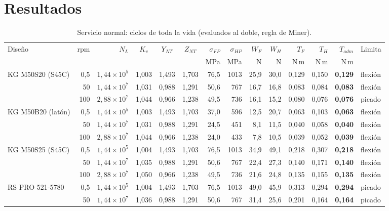 \documentclass[11pt,a4paper]{article}
\begin{document}
\section{Resultados}
\begin{table}[H]\centering\scriptsize\setlength{\tabcolsep}{2.8pt}\caption{Servicio normal: ciclos de toda la vida (evaluados al doble, regla de Miner).}\begin{tabular}{l r r c c c r r r r r r r l}
\toprule
Diseño & rpm & $N_L$ & $K_v$ & $Y_{NT}$ & $Z_{NT}$ & $\sigma_{FP}$ & $\sigma_{HP}$ & $W_F$ & $W_H$ & $T_F$ & $T_H$ & $T_{adm}$ & Limita\\
 & & & & & & MPa & MPa & N & N & N\,m & N\,m & N\,m & \\
\midrule
KG M50S20 (S45C) & 0,5 & $1{,}44\times10^{5}$ & 1,003 & 1,493 & 1,703 & 76,5 & 1013 & 25,9 & 30,0 & 0,129 & 0,150 & \textbf{0,129} & flexión \\
 & 50 & $1{,}44\times10^{7}$ & 1,031 & 0,988 & 1,291 & 50,6 & 767 & 16,7 & 16,8 & 0,083 & 0,084 & \textbf{0,083} & flexión \\
 & 100 & $2{,}88\times10^{7}$ & 1,044 & 0,966 & 1,238 & 49,5 & 736 & 16,1 & 15,2 & 0,080 & 0,076 & \textbf{0,076} & picado \\
\addlinespace[2pt]
KG M50B20 (latón) & 0,5 & $1{,}44\times10^{5}$ & 1,003 & 1,493 & 1,703 & 37,0 & 596 & 12,5 & 20,7 & 0,063 & 0,103 & \textbf{0,063} & flexión \\
 & 50 & $1{,}44\times10^{7}$ & 1,031 & 0,988 & 1,291 & 24,5 & 451 & 8,1 & 11,5 & 0,040 & 0,058 & \textbf{0,040} & flexión \\
 & 100 & $2{,}88\times10^{7}$ & 1,044 & 0,966 & 1,238 & 24,0 & 433 & 7,8 & 10,5 & 0,039 & 0,052 & \textbf{0,039} & flexión \\
\addlinespace[2pt]
KG M50S25 (S45C) & 0,5 & $1{,}44\times10^{5}$ & 1,004 & 1,493 & 1,703 & 76,5 & 1013 & 34,9 & 49,1 & 0,218 & 0,307 & \textbf{0,218} & flexión \\
 & 50 & $1{,}44\times10^{7}$ & 1,035 & 0,988 & 1,291 & 50,6 & 767 & 22,4 & 27,3 & 0,140 & 0,171 & \textbf{0,140} & flexión \\
 & 100 & $2{,}88\times10^{7}$ & 1,050 & 0,966 & 1,238 & 49,5 & 736 & 21,6 & 24,8 & 0,135 & 0,155 & \textbf{0,135} & flexión \\
\addlinespace[2pt]
RS PRO 521-5780 & 0,5 & $1{,}44\times10^{5}$ & 1,004 & 1,493 & 1,703 & 76,5 & 1013 & 49,0 & 45,9 & 0,313 & 0,294 & \textbf{0,294} & picado \\
 & 50 & $1{,}44\times10^{7}$ & 1,036 & 0,988 & 1,291 & 50,6 & 767 & 31,4 & 25,6 & 0,201 & 0,164 & \textbf{0,164} & picado \\

\end{tabular}
\end{table}
\end{document}
